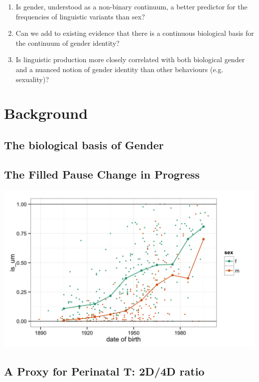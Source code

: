 \documentclass[a0,portrait]{a0poster}
\begin{document}
\begin{multicols}{2}
\begin{enumerate}
\item Is gender, understood as a non-binary continuum, a better predictor for the frequencies of linguistic variants than sex?
\item Can we add to existing evidence that there is a continuous biological basis for the continuum of gender identity?
\item Is linguistic production more closely correlated with both biological gender and a nuanced notion of gender identity than other behaviours (e.g. sexuality)?


\end{enumerate}
\section*{Background}
\subsection{The biological basis of Gender}


\subsection{The Filled Pause Change in Progress}

\begin{center}\vspace{1cm}
\includegraphics[width=0.8\linewidth]{um.png}
\end{center}\vspace{1cm}

\subsection{A Proxy for Perinatal T: 2D/4D ratio}


\end{multicols}
\end{document}
